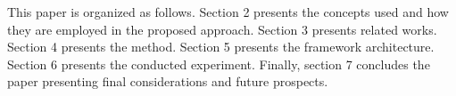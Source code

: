 




This paper is organized as follows. Section 2 presents the concepts used and how they are employed in the proposed approach. Section 3 presents related works. Section 4 presents the method. Section 5 presents the framework architecture. Section 6 presents the conducted experiment. Finally, section 7 concludes the paper presenting final considerations and future prospects.